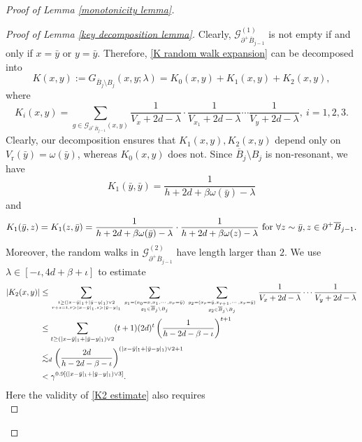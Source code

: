 \documentclass[11pt,reqno,UTF8,twoside]{amsart}
\newcommand{\mcG}{\mathcal{G}}
\newcommand{\barB}{\overline{B}}
\theoremstyle{definition}
\numberwithin{equation}{section}
\begin{document}
\begin{proof}[Proof of Lemma \ref{monotonicity lemma}]
\begin{proof}[Proof of Lemma \ref{key decomposition lemma}]
Clearly, $\mcG_{\partial^+ \barB_{j-1}}^{(1)}$ is not empty if and only if $x=\bar{y}$ or $y=\bar{y}$. Therefore, \eqref{K random walk expansion} can be decomposed into 
\begin{equation}\label{decomposition of K}
  K(x,y):= G_{\barB_{j}\setminus B_j}(x,y;\lambda) =K_0(x,y)+K_1(x,y)+K_2(x,y),
\end{equation}
where 
\begin{equation}\label{Ki comes from graph decomposition}
  K_i(x,y)= \sum_{g\in \mcG_{\partial^+ \barB_{j-1}}(x,y)}  \frac{1}{V_{x}+2d-\lambda}\cdot \frac{1}{V_{x_1}+2d-\lambda}\cdots \frac{1}{V_{y}+2d-\lambda}, \ i=1,2,3 .
\end{equation}
Clearly, our decomposition ensures that $K_1(x,y),K_2(x,y)$ depend only  on $V_{\text{r}}(\bar{y})=\omega(\bar{y})$, whereas $K_0(x,y)$ does not. Since $\barB_{j}\setminus B_j$ is non-resonant, we have 
\begin{equation}\label{K1 formula 1}
  K_1(\bar{y},\bar{y})= \frac{1}{h+2d+\beta \omega(\bar{y})-\lambda} 
\end{equation}
and
\begin{equation}\label{K1 formula 2}
  K_1(\bar{y},z)=K_1(z,\bar{y})=\frac{1}{h+2d+\beta \omega(\bar{y})-\lambda} \cdot \frac{1}{h+2d+\beta \omega(z)-\lambda} \ {\rm for}\ \forall z\sim \bar{y},z\in \partial^+\barB_{j-1}.
\end{equation} 
Moreover, the random walks in $\mcG_{\partial^+ \barB_{j-1}}^{(2)}$ have length larger than $2$.
We use $\lambda\in [-\iota,4d+\beta+\iota]$ to estimate
\begin{align}\label{K2 estimate}
\notag  |K_2(x,y)| & \leq \sum_{t \geq (|x-\bar{y}|_1+|\bar{y}-y|_1)\vee 2 \atop r+s=t,r>|x-\bar{y}|_1,s>|\bar{y}-y|_1} \sum_{ g_1 =(x_0=x, x_1,\cdots,x_r=\bar{y}) \atop g_1\in \barB_j\setminus B_j} \sum_{ g_2 =(x_r=\bar{y}, x_{r+1},\cdots,x_r=\bar{y}) \atop g_2\in \barB_j\setminus B_j} \frac{1}{V_{x}+2d-\lambda}\cdots \frac{1}{V_{y}+2d-\lambda}  \\
 \notag  &\leq \sum_{t \geq (|x-\bar{y}|_1+|\bar{y}-y|_1)\vee 2 } (t+1) (2d)^t \left(\frac{1}{h-2d-\beta-\iota}\right)^{t+1} \\
\notag & \lesssim_d \left(\frac{2d}{h-2d-\beta-\iota}\right)^{(|x-\bar{y}|_1+|\bar{y}-y|_1)\vee 2 +1}\\
      &<\gamma^{0.9[(|x-\bar{y}|_1+|\bar{y}-y|_1)\vee 3]}.
\end{align}
Here the validity of \eqref{K2 estimate} also requires 
\begin{equation}\label{essential barrier high 3}

\end{equation}
\end{proof}
\end{proof}
\end{document}
